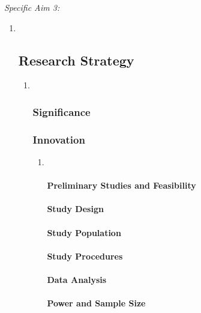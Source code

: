\emph{Specific Aim 3:}

\begin{enumerate}
\item ~

\subsection{Research Strategy}\label{research-strategy}

\begin{enumerate}
  \item ~

\subsubsection{Significance}\label{significance}

\subsubsection{Innovation}\label{innovation}

\begin{enumerate}
    \item ~
      \paragraph{Preliminary Studies and
      Feasibility}\label{preliminary-studies-and-feasibility}

\paragraph{Study Design}\label{study-design}

\paragraph{Study Population}\label{study-population}

\paragraph{Study Procedures}\label{study-procedures}

\paragraph{Data Analysis}\label{data-analysis}

\paragraph{Power and Sample Size}\label{power-and-sample-size}


\end{enumerate}
\end{enumerate}
\end{enumerate}

